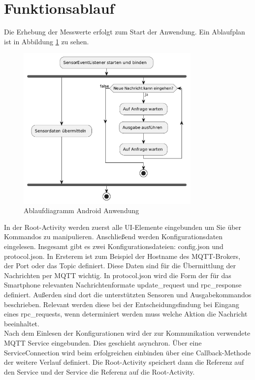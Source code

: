 \documentclass[11pt,a4paper]{report}
\begin{document}
\section{Funktionsablauf}
Die Erhebung der Messwerte erfolgt zum Start der Anwendung.
Ein Ablaufplan ist in Abbildung \ref{fig:app_flow} zu sehen.
\begin{figure}[htbp]
  \centering
  \includegraphics[width=0.8\textwidth]{images/app_ablauf}
  \caption{Ablaufdiagramm Android Anwendung}
  \label{fig:app_flow}
\end{figure}
In der Root-Activity werden zuerst alle UI-Elemente eingebunden um Sie über Kommandos zu manipulieren.
Anschließend werden Konfigurationsdaten eingelesen.
Insgesamt gibt es zwei Konfigurationsdateien: config.json und protocol.json.
In Ersterem ist zum Beispiel der Hostname des MQTT-Brokers, der Port oder das Topic definiert.
Diese Daten sind für die Übermittlung der Nachrichten per MQTT wichtig.
In protocol.json wird die Form der für das Smartphone relevanten Nachrichtenformate update\_request und rpc\_response definiert.
Außerden sind dort die unterstützten Sensoren und Ausgabekommandos beschrieben.
Relevant werden diese bei der Entscheidungsfindung bei Eingang eines rpc\_requests, wenn determiniert werden muss welche Aktion die Nachricht beeinhaltet.
\\
Nach dem Einlesen der Konfigurationen wird der zur Kommunikation verwendete MQTT Service eingebunden.
Dies geschieht asynchron.
Über eine ServiceConnection wird beim erfolgreichen einbinden über eine Callback-Methode der weitere Verlauf definiert.
Die Root-Activity speichert dann die Referenz auf den Service und der Service die Referenz auf die Root-Activity.
\end{document}
